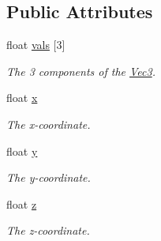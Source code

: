 \subsection*{Public Attributes}
\begin{DoxyCompactItemize}
\item 
float \hyperlink{classgfxmath_1_1_vec3_a9ce2feb7167c9fd1d521838da1daa7f9}{vals} \mbox{[}3\mbox{]}
\begin{DoxyCompactList}\small\item\em The 3 components of the \hyperlink{classgfxmath_1_1_vec3}{Vec3}. \end{DoxyCompactList}\item 
float \hyperlink{classgfxmath_1_1_vec3_adb7cecf3b6d25eecf3924583f41d8c3a}{x}
\begin{DoxyCompactList}\small\item\em The x-\/coordinate. \end{DoxyCompactList}\item 
float \hyperlink{classgfxmath_1_1_vec3_a398bee406395fdc1ad381f5b70d7fd99}{y}
\begin{DoxyCompactList}\small\item\em The y-\/coordinate. \end{DoxyCompactList}\item 
float \hyperlink{classgfxmath_1_1_vec3_a93c1920712889d4f10520c7dc76a79c7}{z}
\begin{DoxyCompactList}\small\item\em The z-\/coordinate. \end{DoxyCompactList}\end{DoxyCompactItemize}
